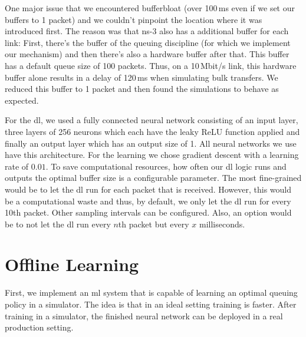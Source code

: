 \documentclass[conference]{IEEEtran}
\begin{document}
One major issue that we encountered bufferbloat (over 100\,ms even if we set our buffers to 1 packet) and we couldn't pinpoint the location where it was introduced first. The reason was that ns-3 also has a additional buffer for each link: First, there's the buffer of the queuing discipline (for which we implement our mechanism) and then there's also a hardware buffer after that. This buffer has a default queue size of 100 packets. Thus, on a 10\,Mbit/s link, this hardware buffer alone results in a delay of 120\,ms when simulating bulk transfers. We reduced this buffer to 1 packet and then found the simulations to behave as expected. 

For the \gls{dl}, we used a fully connected neural network consisting of an input layer, three layers of 256 neurons which each have the leaky ReLU \cite{noauthor_rectifier_2020} function applied and finally an output layer which has an output size of 1. All neural networks we use have this architecture. For the learning we chose gradient descent with a learning rate of $0.01$. To save computational resources, how often our \gls{dl} logic runs and outputs the optimal buffer size is a configurable parameter. The most fine-grained would be to let the \gls{dl} run for each packet that is received. However, this would be a computational waste and thus, by default, we only let the \gls{dl} run for every 10th packet. Other sampling intervals can be configured. Also, an option would be to not let the \gls{dl} run every $n$th packet but every $x$ milliseconds. 

\section{Offline Learning}

First, we implement an \gls{ml} system that is capable of learning an optimal queuing policy in a simulator. The idea is that in an ideal setting training is faster. After training in a simulator, the finished neural network can be deployed in a real production setting. 
\end{document}
